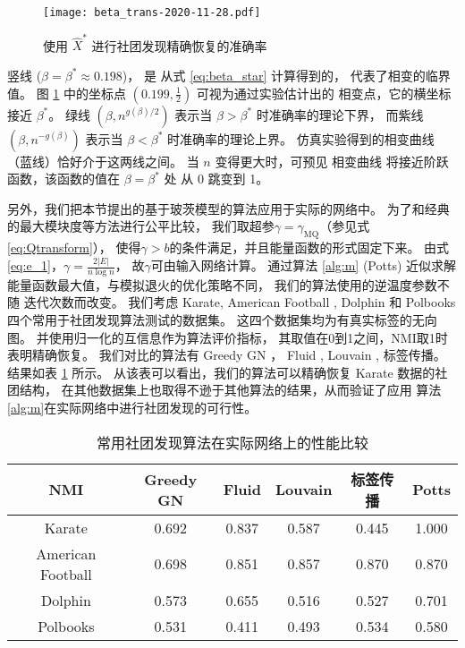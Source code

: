 \begin{figure}[ht!]
	\centering
		\texttt{[image: beta\_trans-2020-11-28.pdf]}
		\caption{使用 $\hat{X}^*$ 进行社团发现精确恢复的准确率}\label{fig:erh}
\end{figure}


竖线 ($\beta=\beta^* \approx 0.198$)，
是 从式 \eqref{eq:beta_star} 计算得到的， 
代表了相变的临界值。
图 \ref{fig:erh} 中的坐标点 $(0.199,\frac{1}{2})$
可视为通过实验估计出的
相变点，它的横坐标接近
$\beta^*$。
绿线 $(\beta, n^{g(\beta)/2})$ 
表示当 $\beta>\beta^*$ 时准确率的理论下界，
而紫线
$(\beta, n^{-g(\beta)})$ 
表示当 $\beta<\beta^*$ 时准确率的理论上界。
仿真实验得到的相变曲线（蓝线）恰好介于这两线之间。
当 $n$ 变得更大时，可预见
相变曲线 将接近阶跃函数，该函数的值在
$\beta=\beta^*$ 处
从 0 跳变到 1。

另外，我们把本节提出的基于玻茨模型的算法应用于实际的网络中。
为了和经典的最大模块度等方法进行公平比较，
我们取超参$\gamma=\gamma_{\mathrm{MQ}}$（参见式\eqref{eq:Qtransform}），
使得$\gamma>b$的条件满足，并且能量函数的形式固定下来。
由式\eqref{eq:e_1}，$\gamma = \frac{2|E|}{n \log n}$，
故$\gamma$可由输入网络计算。
通过算法 \ref{alg:m} (Potts) 近似求解能量函数最大值，与模拟退火的优化策略不同，
我们的算法使用的逆温度参数不随
迭代次数而改变。
我们考虑 Karate\cite{zachary1977information},
American Football \cite{girvan2002community},
Dolphin \cite{lusseau2003emergent}
和 Polbooks \cite{newman2006modularity}
四个常用于社团发现算法测试的数据集。
这四个数据集均为有真实标签的无向图。
并使用归一化的互信息\cite{Danon_2005}作为算法评价指标，
其取值在0到1之间，NMI取1时表明精确恢复。
我们对比的算法有
Greedy GN \cite{clauset2004finding}，
Fluid \cite{pares2018fluid},
Louvain \cite{blondel2008fast},
标签传播\cite{cordasco2010community}。
结果如表 \ref{tab:flatten_result} 所示。
从该表可以看出，我们的算法可以精确恢复 Karate 数据的社团结构，
在其他数据集上也取得不逊于其他算法的结果，从而验证了应用
算法 \ref{alg:m}在实际网络中进行社团发现的可行性。

\begin{table}[!ht]
    \begin{adjustbox}{width=\columnwidth,center}
    \begin{tabular}{cccccc}
    \hline
    NMI               & Greedy GN & Fluid & Louvain  & 标签传播 & Potts\\
    \hline
    Karate            & 0.692     & 0.837 & 0.587   & 0.445         & 1.000     \\
    American Football & 0.698     & 0.851 & 0.857    & 0.870         & 0.870    \\
    Dolphin           & 0.573     & 0.655 & 0.516    & 0.527        & 0.701     \\
    Polbooks          & 0.531     & 0.411 & 0.493  & 0.534          & 0.580     \\
    \hline
    \end{tabular}
\end{adjustbox}
    \caption{常用社团发现算法在实际网络上的性能比较}\label{tab:flatten_result}
\end{table}

